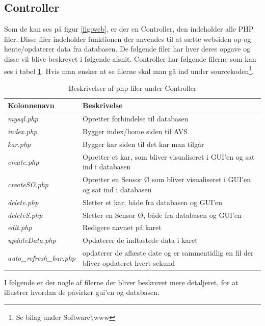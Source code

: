 \subsection{Controller}
Som de kan ses på figur \ref{fig:web}, er der en Controller, den indeholder alle PHP filer. Disse filer indeholder funktionen der anvendes til at sætte websiden op og hente/opdaterer data fra databasen. De følgende filer har hver deres opgave og disse vil blive beskrevet i følgende afsnit. Controller har følgende filerne som kan ses i tabel \ref{table:con_fil}. Hvis man ønsker at se filerne skal man gå ind under sourcekoden\footnote{Se bilag under Software\textbackslash www}.

\begin{table}[H]
\center
\setlength{\tabcolsep}{16pt}
\renewcommand{\arraystretch}{1.5}
	\begin{tabular}{ | >{\raggedright}p{3cm} | >{\raggedright\arraybackslash}p{9cm} | }
    \hline
    \rowcolor{lightgray} 
    \textbf{Kolonnenavn} 				& \textbf{Beskrivelse}  						\\ \hline
    \textit{mysql.php} 							& Opretter forbindelse til databasen											\\ \hline
    \textit{index.php}							& Bygger index/home siden til AVS												\\ \hline
    \textit{kar.php}							& Bygger kar siden til det kar man tilgår										\\ \hline
    \textit{create.php} 						& Opretter et kar, som bliver visualiseret i GUI'en og sat ind i databasen		\\ \hline
  	\textit{createSO.php} 						& Opretter en Sensor Ø som bliver visualiseret i GUI'en og sat ind i databasen	\\ \hline
   	\textit{delete.php} 						& Sletter et kar, både fra databasen og GUI'en									\\ \hline
   	\textit{deleteS.php}	 					& Sletter en Sensor Ø, både fra databasen og GUI'en							 	\\ \hline
   	\textit{edit.php}							& Redigere navnet på karet														\\ \hline
   	\textit{updateData.php}						& Opdaterer de indtastede data i karet											\\ \hline
   	\textit{auto\_refresh\_kar.php}				& opdaterer de aflæste date og er sammentidlig en fil der bliver opdateret hvert sekund \\ \hline
\end{tabular}
\caption{Beskrivelser af php filer under Controller}
\label{table:con_fil}
\end{table}
I følgende er der nogle af filerne der bliver beskrevet mere detaljeret, for at illustrer hvordan de påvirker gui'en og databasen.


